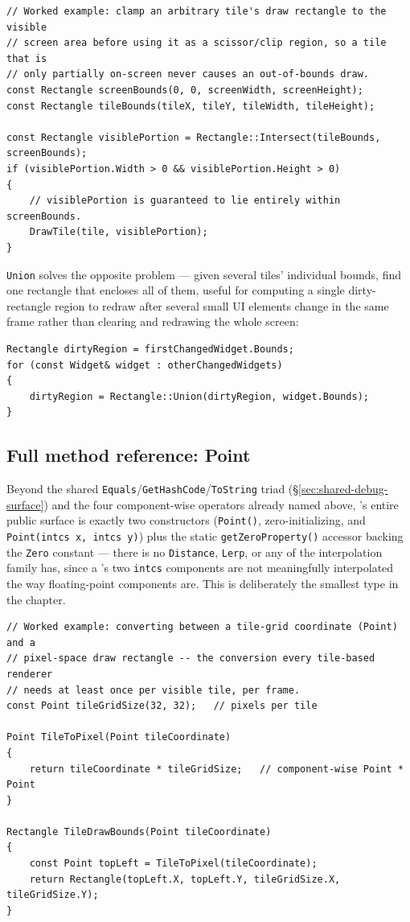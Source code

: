 \begin{lstlisting}
// Worked example: clamp an arbitrary tile's draw rectangle to the visible
// screen area before using it as a scissor/clip region, so a tile that is
// only partially on-screen never causes an out-of-bounds draw.
const Rectangle screenBounds(0, 0, screenWidth, screenHeight);
const Rectangle tileBounds(tileX, tileY, tileWidth, tileHeight);

const Rectangle visiblePortion = Rectangle::Intersect(tileBounds, screenBounds);
if (visiblePortion.Width > 0 && visiblePortion.Height > 0)
{
    // visiblePortion is guaranteed to lie entirely within screenBounds.
    DrawTile(tile, visiblePortion);
}
\end{lstlisting}

\texttt{Union} solves the opposite problem --- given several tiles' individual bounds, find one
rectangle that encloses all of them, useful for computing a single dirty-rectangle region to
redraw after several small UI elements change in the same frame rather than clearing and
redrawing the whole screen:

\begin{lstlisting}
Rectangle dirtyRegion = firstChangedWidget.Bounds;
for (const Widget& widget : otherChangedWidgets)
{
    dirtyRegion = Rectangle::Union(dirtyRegion, widget.Bounds);
}
\end{lstlisting}

\subsection{Full method reference: Point}

Beyond the shared \texttt{Equals}/\texttt{GetHashCode}/\texttt{ToString} triad
(\S\ref{sec:shared-debug-surface}) and the four component-wise operators already named above,
's entire public surface is exactly two constructors (\texttt{Point()},
zero-initializing, and \texttt{Point(intcs x, intcs y)}) plus the static \texttt{getZeroProperty()}
accessor backing the \texttt{Zero} constant --- there is no \texttt{Distance}, \texttt{Lerp}, or
any of the interpolation family  has, since a 's two
\texttt{intcs} components are not meaningfully interpolated the way floating-point components
are. This is deliberately the smallest type in the chapter.

\begin{lstlisting}
// Worked example: converting between a tile-grid coordinate (Point) and a
// pixel-space draw rectangle -- the conversion every tile-based renderer
// needs at least once per visible tile, per frame.
const Point tileGridSize(32, 32);   // pixels per tile

Point TileToPixel(Point tileCoordinate)
{
    return tileCoordinate * tileGridSize;   // component-wise Point * Point
}

Rectangle TileDrawBounds(Point tileCoordinate)
{
    const Point topLeft = TileToPixel(tileCoordinate);
    return Rectangle(topLeft.X, topLeft.Y, tileGridSize.X, tileGridSize.Y);
}
\end{lstlisting}

